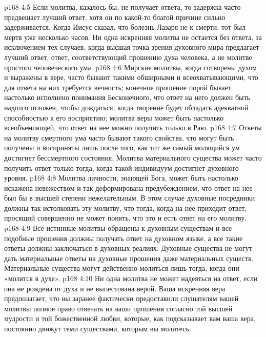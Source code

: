 \vs p168 4:5 \pc {}\bibnobreakspace Если молитва, казалось бы, не получает ответа, то задержка часто предвещает лучший ответ, хотя он по какой\hyp{}то благой причине сильно задерживается. Когда Иисус сказал, что болезнь Лазаря не к смерти, тот был мертв уже несколько часов. Ни одна искренняя молитва не остается без ответа, за исключением тех случаев, когда высшая точка зрения духовного мира предлагает лучший ответ, ответ, соответствующий прошению духа человека, а не молитве простого человеческого ума.
\vs p168 4:6 \pc {}\bibnobreakspace Мирские молитвы, когда сотворены духом и выражены в вере, часто бывают такими обширными и всеохватывающими, что для ответа на них требуется вечность; конечное прошение порой бывает настолько исполнено понимания Бесконечного, что ответ на него должен быть надолго отложен, чтобы дождаться, когда творение будет обладать адекватной способностью к его восприятию; молитва веры может быть настолько всеобъемлющей, что ответ на нее можно получить только в Раю.
\vs p168 4:7 \pc {}\bibnobreakspace Ответы на молитву смертного ума часто бывают такого свойства, что могут быть получены и восприняты лишь после того, как тот же самый молящийся ум достигнет бессмертного состояния. Молитва материального существа может часто получить ответ только тогда, когда такой индивидуум достигнет духовного уровня.
\vs p168 4:8 \pc {}\bibnobreakspace Молитва личности, знающей Бога, может быть настолько искажена невежеством и так деформирована предубеждением, что ответ на нее был бы в высшей степени нежелательным. В этом случае духовные посредники должны так истолковать эту молитву, что тогда, когда на нее приходит ответ, просящий совершенно не может понять, что это и есть ответ на его молитву.
\vs p168 4:9 \pc {}\bibnobreakspace Все истинные молитвы обращены к духовным существам и все подобные прошения должны получать ответ на духовном языке, а все такие ответы должны заключаться в духовных реалиях. Духовные существа не могут дать материальные ответы на духовные прошения даже материальных существ. Материальные существа могут действенно молиться лишь тогда, когда они «молятся в духе».
\vs p168 4:10 \pc {}\bibnobreakspace Ни одна молитва не может надеяться на ответ, если она не рождена от духа и не выпестована верой. Ваша искренняя вера предполагает, что вы заранее фактически предоставили слушателям вашей молитвы полное право отвечать на ваши прошения согласно той высшей мудрости и той божественной любви, которые, как подсказывает вам ваша вера, постоянно движут теми существами, которым вы молитесь.
